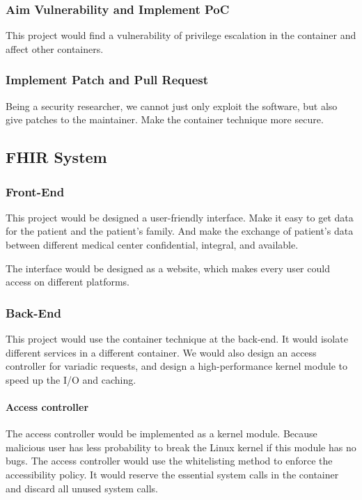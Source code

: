 \documentclass[12pt,a4paper]{article}
\begin{document}
\subsubsection{Aim Vulnerability and Implement PoC}
This project would find a vulnerability of privilege escalation in the container and affect
other containers.

\subsubsection{Implement Patch and Pull Request}
Being a security researcher, we cannot just only exploit the software, but also give patches to
the maintainer. Make the container technique more secure.

\subsection{FHIR System}
\subsubsection{Front-End}
This project would be designed a user-friendly interface. Make it easy to get data for the
patient and the patient's family. And make the exchange of patient's data between different
medical center confidential, integral, and available.

The interface would be designed as a website, which makes every user could access on different
platforms.

\subsubsection{Back-End}
This project would use the container technique at the back-end. It would isolate different
services in a different container. We would also design an access controller for variadic
requests, and design a high-performance kernel module to speed up the I/O and caching.

\paragraph{Access controller}
The access controller would be implemented as a kernel module. Because malicious user has less
probability to break the Linux kernel if this module has no bugs.
The access controller would use the whitelisting method to enforce the accessibility policy.
It would reserve the essential system calls in the container and discard all unused system calls.
\end{document}
